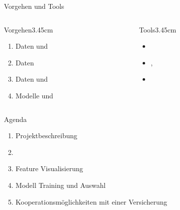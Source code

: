 \begin{frame}{Vorgehen und Tools}
\begin{columns}
\begin{column}{0.5\textwidth}
\begin{MRuleBlock}{Vorgehen}{3.45cm}{\textwidth}
\begin{enumerate}
\item Daten  und 
\item Daten 
\item Daten  und 
\item Modelle  und 
\end{enumerate}
\end{MRuleBlock}
\end{column}
\begin{column}{0.5\textwidth }
\centering
\begin{MRuleBlock}{Tools}{3.45cm}{\textwidth}
\vspace{0.5\baselineskip}
\begin{itemize}
\item {}
\item {}, 
\item {}
\end{itemize}
\vspace{0.3\baselineskip}
\end{MRuleBlock}
\end{column}
\end{columns}
\end{frame}


\begin{frame}{Agenda}
\centering
\myBlock[0.6]{}
{
\begin{enumerate}
\item Projektbeschreibung
\item {}
\item Feature Visualisierung
\item Modell Training und Auswahl
\item Kooperationsmöglichkeiten mit einer Versicherung
\end{enumerate}
}
\end{frame}

